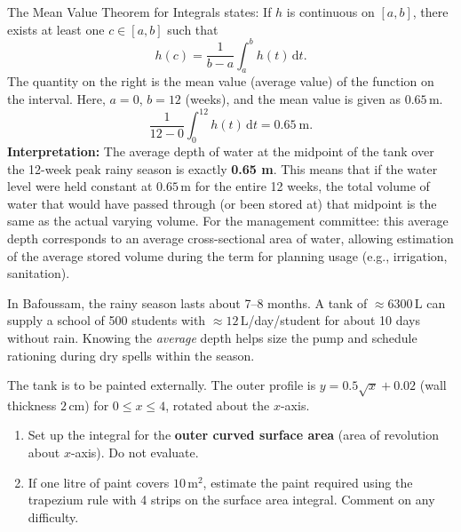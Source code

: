 \documentclass[11pt]{article}
\newcommand{\cle}[1]{{\popxbold\color{popdark}#1}}
\newcounter{popsec}
\newcounter{popsub}
\newcommand{\courssub}[1]{%
  \stepcounter{popsub}%
  \par\vspace{9pt}\noindent{\popxbold\fontsize{11.5}{13}\selectfont\color{popink}{\color{poporange}\thepopsec.\thepopsub}\hspace{6pt}#1}\par\nopagebreak\vspace{4pt}
}
\begin{document}
\begin{exoresolu}
The Mean Value Theorem for Integrals states: If $h$ is continuous on $[a,b]$, there exists at least one $c \in [a,b]$ such that
\[
h(c) = \frac{1}{b-a} \int_a^b h(t)\,\mathrm{d}t.
\]
The quantity on the right is the \cle{mean value (average value)} of the function on the interval.
Here, $a=0$, $b=12$ (weeks), and the mean value is given as $0.65\,\mathrm{m}$.
\[
\frac{1}{12-0} \int_0^{12} h(t)\,\mathrm{d}t = 0.65\ \mathrm{m}.
\]
\textbf{Interpretation:} The average depth of water at the midpoint of the tank over the 12-week peak rainy season is exactly \textbf{0.65 m}.
This means that if the water level were held constant at $0.65\,\mathrm{m}$ for the entire 12 weeks, the total volume of water that would have passed through (or been stored at) that midpoint is the same as the actual varying volume. For the management committee: this average depth corresponds to an average cross-sectional area of water, allowing estimation of the average stored volume during the term for planning usage (e.g., irrigation, sanitation).
\end{exoresolu}

\begin{savaistu}
In Bafoussam, the rainy season lasts about 7--8 months. A tank of $\approx 6300\,\mathrm{L}$ can supply a school of 500 students with $\approx 12\,\mathrm{L}$/day/student for about 10 days without rain. Knowing the \emph{average} depth helps size the pump and schedule rationing during dry spells within the season.
\end{savaistu}

\courssub{Extension Exercise}
\begin{exercice}
The tank is to be painted externally. The outer profile is $y = 0.5\sqrt{x} + 0.02$ (wall thickness $2\,\mathrm{cm}$) for $0 \le x \le 4$, rotated about the $x$-axis.
\begin{enumerate}
    \item Set up the integral for the \textbf{outer curved surface area} (area of revolution about $x$-axis). Do not evaluate.
    \item If one litre of paint covers $10\,\mathrm{m}^2$, estimate the paint required using the trapezium rule with 4 strips on the surface area integral. Comment on any difficulty.
\end{enumerate}
\end{exercice}
\end{document}

